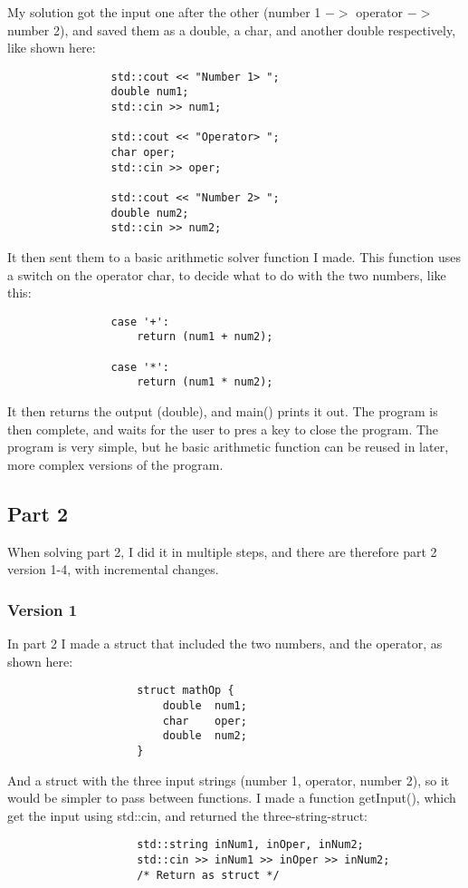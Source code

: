 \documentclass{article}
\begin{document}
			My solution got the input one after the other (number 1 $->$ operator $->$ number 2), and saved them as a double, a char, and another double respectively, like shown here:
			\begin{lstlisting}
				std::cout << "Number 1> ";
				double num1;
				std::cin >> num1;
				
				std::cout << "Operator> ";
				char oper;
				std::cin >> oper;
				
				std::cout << "Number 2> ";
				double num2;
				std::cin >> num2;
			\end{lstlisting}
			
			It then sent them to a basic arithmetic solver function I made. This function uses a switch on the operator char, to decide what to do with the two numbers, like this:
			\begin{lstlisting}
				case '+':
					return (num1 + num2);
				
				case '*':
					return (num1 * num2);
			\end{lstlisting}
			
			It then returns the output (double), and main() prints it out. The program is then complete, and waits for the user to pres a key to close the program. The program is very simple, but he basic arithmetic function can be reused in later, more complex versions of the program.
		
		
		\subsection{Part 2}
			When solving part 2, I did it in multiple steps, and there are therefore part 2 version 1-4, with incremental changes.
			\subsubsection{Version 1}
				In part 2 I made a struct that included the two numbers, and the operator, as shown here:
				\begin{lstlisting}
					struct mathOp {
						double	num1;
						char	oper;
						double	num2;
					}
				\end{lstlisting}
				
				And a struct with the three input strings (number 1, operator, number 2), so it would be simpler to pass between functions. I made a function getInput(), which get the input using std::cin, and returned the three-string-struct:
				\begin{lstlisting}
					std::string inNum1, inOper, inNum2;
					std::cin >> inNum1 >> inOper >> inNum2;
					/* Return as struct */
				\end{lstlisting}
				
\end{document}
